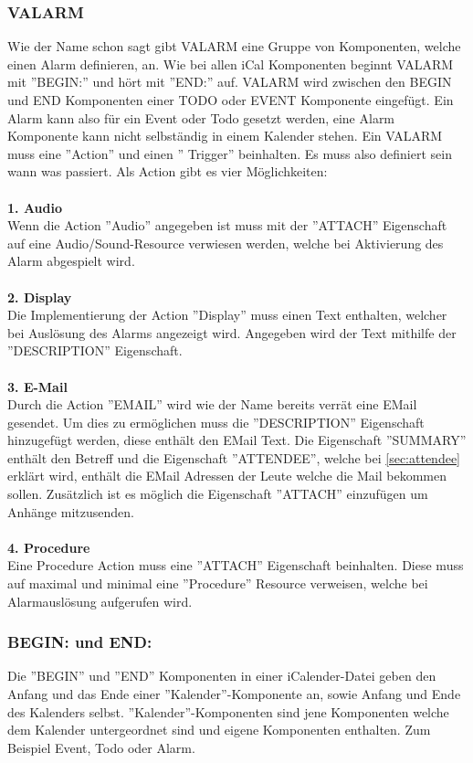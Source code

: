 \subsubsection{VALARM}
\label{sec:vAlarm} 
Wie der Name schon sagt gibt VALARM eine Gruppe von Komponenten, welche einen Alarm definieren, an.  Wie bei allen iCal Komponenten beginnt VALARM mit ''BEGIN:'' und hört mit ''END:'' auf. VALARM wird zwischen den BEGIN und END Komponenten einer TODO oder EVENT Komponente eingefügt. Ein Alarm kann also für ein Event oder Todo gesetzt werden, eine Alarm Komponente kann nicht selbständig in einem Kalender stehen. Ein VALARM muss eine ''Action'' und einen '' Trigger'' beinhalten. Es muss also definiert sein wann was passiert. Als Action gibt es vier Möglichkeiten: \\ \\
\textbf{1. Audio} \\
Wenn die Action ''Audio'' angegeben ist muss mit der ''ATTACH'' Eigenschaft auf eine Audio/Sound-Resource verwiesen werden, welche bei Aktivierung des Alarm abgespielt wird. \\ \\
\textbf{2. Display} \\ 
Die Implementierung der Action ''Display'' muss einen Text enthalten, welcher bei Auslösung des Alarms angezeigt wird. Angegeben wird der Text mithilfe der ''DESCRIPTION'' Eigenschaft. \\ \\
\textbf{3. E-Mail} \\ 
Durch die Action ''EMAIL'' wird wie der Name bereits verrät eine EMail gesendet. Um dies zu ermöglichen muss die ''DESCRIPTION'' Eigenschaft hinzugefügt werden, diese enthält den EMail Text. Die Eigenschaft ''SUMMARY'' enthält den Betreff und die Eigenschaft ''ATTENDEE'', welche bei \ref{sec:attendee} erklärt wird, enthält die EMail Adressen der Leute welche die Mail bekommen sollen. Zusätzlich ist es möglich die Eigenschaft ''ATTACH'' einzufügen um Anhänge mitzusenden. \\ \\
\textbf{4. Procedure} \\ %
Eine Procedure Action muss eine ''ATTACH'' Eigenschaft beinhalten. Diese muss auf maximal und minimal eine ''Procedure'' Resource verweisen, welche bei Alarmauslösung aufgerufen wird.
\subsubsection{BEGIN: und END:}
\label{sec:beginUndEnd} 
Die ''BEGIN'' und ''END'' Komponenten in einer iCalender-Datei geben den Anfang und das Ende einer ''Kalender''-Komponente an, sowie Anfang und Ende des Kalenders selbst. ''Kalender''-Komponenten sind jene Komponenten welche dem Kalender untergeordnet sind und eigene Komponenten enthalten. Zum Beispiel Event, Todo oder Alarm. 
